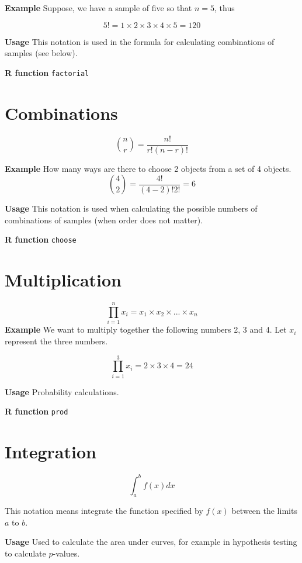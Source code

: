 \documentclass[
  oneside]{krantz}
\begin{document}
\textbf{Example} Suppose, we have a sample of five so that \(n = 5\), thus

\[5! = 1 \times 2 \times 3 \times 4 \times 5 = 120 \]

\textbf{Usage} This notation is used in the formula for calculating combinations of samples (see below).

\textbf{R function} \texttt{factorial}

\hypertarget{combinations}{%
\section{Combinations}\label{combinations}}

\[{n \choose r} = \frac{n!}{r!(n-r)!} \]

\textbf{Example} How many ways are there to choose 2 objects from a set of 4 objects.
\[{4 \choose 2} = \frac{4!}{(4-2)!2!} = 6\]

\textbf{Usage} This notation is used when calculating the possible numbers of combinations of samples (when order does not matter).

\textbf{R function} \texttt{choose}

\hypertarget{multiplication}{%
\section{Multiplication}\label{multiplication}}

\[\prod_{i=1} ^{n} x_i = x_1 \times x_2 \times ...\times x_n\]
\textbf{Example} We want to multiply together the following numbers 2, 3 and 4. Let \(x_i\) represent the three numbers.

\[\prod_{i=1} ^{3} x_i = 2 \times 3 \times 4 = 24\]

\textbf{Usage} Probability calculations.

\textbf{R function} \texttt{prod}

\hypertarget{integration}{%
\section{Integration}\label{integration}}

\[\int_a^b f(x) dx \]

This notation means integrate the function specified by \(f(x)\) between the limits \(a\) to \(b\).

\textbf{Usage} Used to calculate the area under curves, for example in hypothesis testing to calculate \(p\)-values.
\end{document}

